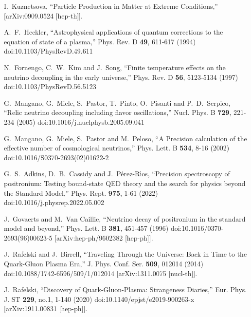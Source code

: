 \documentclass[universe,article,submit,moreauthors,pdftex,a4paper]{Definitions/mdpi}
\begin{document}
\begin{thebibliography}{99}
I.~Kuznetsova,
``Particle Production in Matter at Extreme Conditions,''
[arXiv:0909.0524 [hep-th]].

A.~F.~Heckler,
``Astrophysical applications of quantum corrections to the equation of state of a plasma,''
Phys. Rev. D \textbf{49}, 611-617 (1994)
doi:10.1103/PhysRevD.49.611

N.~Fornengo, C.~W.~Kim and J.~Song,
``Finite temperature effects on the neutrino decoupling in the early universe,''
Phys. Rev. D \textbf{56}, 5123-5134 (1997)
doi:10.1103/PhysRevD.56.5123

G.~Mangano, G.~Miele, S.~Pastor, T.~Pinto, O.~Pisanti and P.~D.~Serpico,
``Relic neutrino decoupling including flavor oscillations,''
Nucl. Phys. B \textbf{729}, 221-234 (2005)
doi:10.1016/j.nuclphysb.2005.09.041

G.~Mangano, G.~Miele, S.~Pastor and M.~Peloso,
``A Precision calculation of the effective number of cosmological neutrinos,''
Phys. Lett. B \textbf{534}, 8-16 (2002)
doi:10.1016/S0370-2693(02)01622-2

G.~S.~Adkins, D.~B.~Cassidy and J.~P\'erez-R\'\i{}os,
``Precision spectroscopy of positronium: Testing bound-state QED theory and the search for physics beyond the Standard Model,''
Phys. Rept. \textbf{975}, 1-61 (2022)
doi:10.1016/j.physrep.2022.05.002

J.~Govaerts and M.~Van Caillie,
``Neutrino decay of positronium in the standard model and beyond,''
Phys. Lett. B \textbf{381}, 451-457 (1996)
doi:10.1016/0370-2693(96)00623-5
[arXiv:hep-ph/9602382 [hep-ph]].

J.~Rafelski and J.~Birrell,
``Traveling Through the Universe: Back in Time to the Quark-Gluon Plasma Era,''
J. Phys. Conf. Ser. \textbf{509}, 012014 (2014)
doi:10.1088/1742-6596/509/1/012014
[arXiv:1311.0075 [nucl-th]].

J.~Rafelski,
``Discovery of Quark-Gluon-Plasma: Strangeness Diaries,''
Eur. Phys. J. ST \textbf{229}, no.1, 1-140 (2020)
doi:10.1140/epjst/e2019-900263-x
[arXiv:1911.00831 [hep-ph]].


\end{thebibliography}
\end{document}
